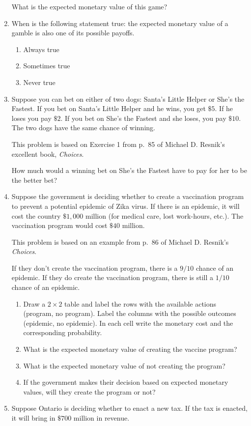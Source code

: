 \documentclass[justified]{tufte-book}
\providecommand{\tightlist}{%
  \setlength{\itemsep}{0pt}\setlength{\parskip}{0pt}}
\theoremstyle{definition}
\theoremstyle{definition}
\theoremstyle{definition}
\theoremstyle{remark}
\begin{document}
\begin{enumerate}
  What is the expected monetary value of this game?
\item
  When is the following statement true: the expected monetary value of a
  gamble is also one of its possible payoffs.

  \begin{enumerate}
  \def\labelenumii{\alph{enumii}.}
  \tightlist
  \item
    Always true
  \item
    Sometimes true
  \item
    Never true
  \end{enumerate}
\item
  Suppose you can bet on either of two dogs: Santa's Little Helper or
  She's the Fastest. If you bet on Santa's Little Helper and he wins,
  you get \(\$5\). If he loses you pay \(\$2\). If you bet on She's the
  Fastest and she loses, you pay \(\$10\). The two dogs have the same
  chance of winning.

  \begin{marginfigure}
  This problem is based on Exercise 1 from p.~85 of Michael D. Resnik's
  excellent book, \emph{Choices}.
  \end{marginfigure}

  How much would a winning bet on She's the Fastest have to pay for her
  to be the better bet?
\item
  Suppose the government is deciding whether to create a vaccination
  program to prevent a potential epidemic of Zika virus. If there is an
  epidemic, it will cost the country \(\$1,000\) million (for medical
  care, lost work-hours, etc.). The vaccination program would cost
  \(\$40\) million.

  \begin{marginfigure}
  This problem is based on an example from p.~86 of Michael D. Resnik's
  \emph{Choices}.
  \end{marginfigure}

  If they don't create the vaccination program, there is a \(9/10\)
  chance of an epidemic. If they do create the vaccination program,
  there is still a \(1/10\) chance of an epidemic.

  \begin{enumerate}
  \def\labelenumii{\alph{enumii}.}
  \tightlist
  \item
    Draw a \(2 \times 2\) table and label the rows with the available
    actions (program, no program). Label the columns with the possible
    outcomes (epidemic, no epidemic). In each cell write the monetary
    cost and the corresponding probability.
  \item
    What is the expected monetary value of creating the vaccine program?
  \item
    What is the expected monetary value of not creating the program?
  \item
    If the government makes their decision based on expected monetary
    values, will they create the program or not?
  \end{enumerate}
\item
  Suppose Ontario is deciding whether to enact a new tax. If the tax is
  enacted, it will bring in \(\$700\) million in revenue.


\end{enumerate}
\end{document}
